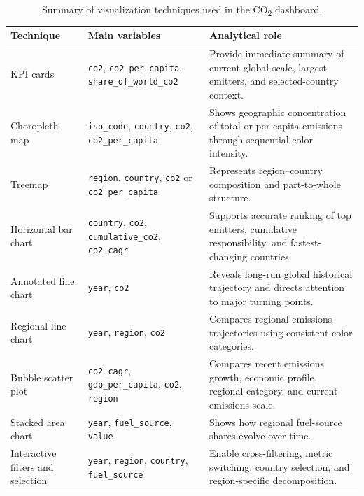 \documentclass[a4paper,12pt]{article}
\begin{document}
\begin{table}[H]
\centering
\caption{Summary of visualization techniques used in the CO\textsubscript{2} dashboard.}
\label{tab:visual-techniques}
\small
\renewcommand{\arraystretch}{1.25}
\begin{tabular}{L{0.23\textwidth} L{0.28\textwidth} L{0.37\textwidth}}
\toprule
\textbf{Technique} & \textbf{Main variables} & \textbf{Analytical role} \\
\midrule
KPI cards & \texttt{co2}, \texttt{co2\_per\_capita}, \texttt{share\_of\_world\_co2} &
Provide immediate summary of current global scale, largest emitters, and selected-country context. \\
Choropleth map & \texttt{iso\_code}, \texttt{country}, \texttt{co2}, \texttt{co2\_per\_capita} &
Shows geographic concentration of total or per-capita emissions through sequential color intensity. \\
Treemap & \texttt{region}, \texttt{country}, \texttt{co2} or \texttt{co2\_per\_capita} &
Represents region--country composition and part-to-whole structure. \\
Horizontal bar chart & \texttt{country}, \texttt{co2}, \texttt{cumulative\_co2}, \texttt{co2\_cagr} &
Supports accurate ranking of top emitters, cumulative responsibility, and fastest-changing countries. \\
Annotated line chart & \texttt{year}, \texttt{co2} &
Reveals long-run global historical trajectory and directs attention to major turning points. \\
Regional line chart & \texttt{year}, \texttt{region}, \texttt{co2} &
Compares regional emissions trajectories using consistent color categories. \\
Bubble scatter plot & \texttt{co2\_cagr}, \texttt{gdp\_per\_capita}, \texttt{co2}, \texttt{region} &
Compares recent emissions growth, economic profile, regional category, and current emissions scale. \\
Stacked area chart & \texttt{year}, \texttt{fuel\_source}, \texttt{value} &
Shows how regional fuel-source shares evolve over time. \\
Interactive filters and selection & \texttt{year}, \texttt{region}, \texttt{country}, \texttt{fuel\_source} &
Enable cross-filtering, metric switching, country selection, and region-specific decomposition. \\
\bottomrule
\end{tabular}
\normalsize
\setlength{\tabcolsep}{6pt}
\end{table}\normalsize 
\end{document}
